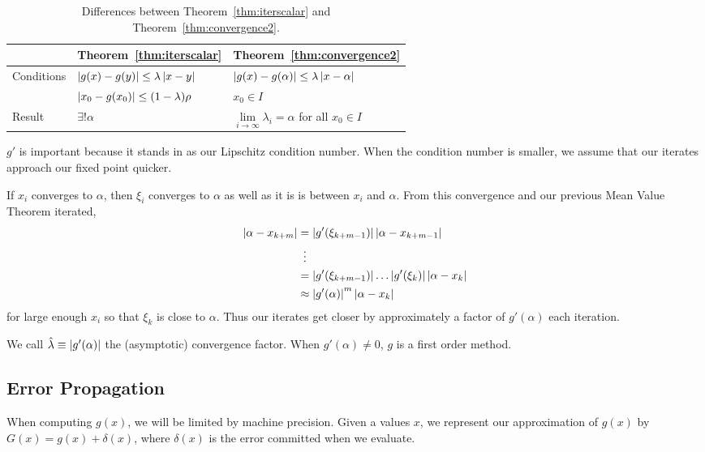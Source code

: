 \documentclass[12pt,letterpaper,DIV=11]{scrartcl}
\theoremstyle{plain}
\theoremstyle{definition}
\theoremstyle{remark}
\begin{document}
\begin{table}
  \centering
  \begin{tabular}{l l l}
    \toprule
  & Theorem~\ref{thm:iterscalar} & Theorem~\ref{thm:convergence2} \\
  \midrule
    \multirow{2}{*}{Conditions} & $\left\lvert g(x) - g(y)\right\rvert \leq \lambda \left\lvert x - y\right\rvert$ & $\left\lvert g(x) - g(\alpha)\right\rvert \leq \lambda \left\lvert x - \alpha\right\rvert$ \\
                                & $\left\lvert x_0 - g(x_0)\right\rvert \leq (1 - \lambda) \rho$ & $x_0 \in I$ \\
                                \midrule
    Result & $\exists! \alpha$ & $\lim\limits_{i \to \infty} \lambda_i = \alpha$ for all $x_0 \in I$ \\
    \bottomrule
  \end{tabular}
  \caption{Differences between Theorem~\ref{thm:iterscalar} and Theorem~\ref{thm:convergence2}.}
\end{table}

$g'$ is important because it stands in as our Lipschitz condition number.
When the condition number is smaller, we assume that our iterates approach our fixed point quicker.

If $x_i$ converges to $\alpha$, then $\xi_i$ converges to $\alpha$ as well as it is is between $x_i$ and $\alpha$.
From this convergence and our previous Mean Value Theorem iterated, \begin{align*}
  \abs{\alpha - x_{k + m}} &= \abs{g'(\xi_{k + m - 1})} \abs{\alpha - x_{k + m - 1}} \\
                           &\vdotswithin{=} \\
                           &= \abs{g'(\xi_{k + m - 1})} \dots \abs{g'(\xi_k)} \abs{\alpha - x_k} \\
                           &\approx \abs{g'(\alpha)}^m \abs{\alpha - x_k}
\end{align*} for large enough $x_i$ so that $\xi_k$ is close to $\alpha$.
Thus our iterates get closer by approximately a factor of $g'(\alpha)$ each iteration.

We call $\hat{\lambda} \equiv \left\lvert g'(\alpha)\right\rvert$ the (asymptotic) convergence factor.
When $g'(\alpha) \neq 0$, $g$ is a first order method.

\subsection{Error Propagation}
When computing $g(x)$, we will be limited by machine precision.
Given a values $x$, we represent our approximation of $g(x)$ by $G(x) = g(x) + \delta(x)$, where $\delta(x)$ is the error committed when we evaluate.
\end{document}
